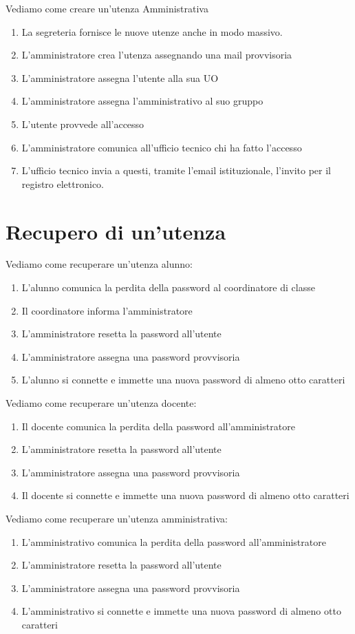 Vediamo come creare un'utenza Amministrativa
\begin{enumerate}
	\item La segreteria fornisce le nuove utenze anche in modo massivo.
	\item L'amministratore crea l'utenza assegnando una mail provvisoria
	\item L'amministratore assegna l'utente alla sua UO
	\item L'amministratore assegna l'amministrativo al suo gruppo
	\item L'utente provvede all'accesso
	\item L'amministratore  comunica all'ufficio tecnico chi ha fatto l'accesso
	\item L'ufficio tecnico invia  a questi, tramite l'email istituzionale, 
	l'invito  per il registro elettronico.
\end{enumerate}
\section{Recupero di un'utenza}
Vediamo come recuperare un'utenza alunno:
\begin{enumerate}
	\item L'alunno comunica la perdita della password al coordinatore di classe
	\item Il coordinatore informa l'amministratore
	\item L'amministratore resetta la password all'utente
	\item L'amministratore assegna una password provvisoria 
	\item L'alunno si connette e immette una nuova password di almeno otto 
	caratteri 
\end{enumerate}
Vediamo come recuperare un'utenza docente:
\begin{enumerate}
	\item Il docente comunica la perdita della password all'amministratore
	\item L'amministratore resetta la password all'utente
	\item L'amministratore assegna una password provvisoria 
	\item Il docente si connette e immette una nuova password di almeno otto 
	caratteri 
\end{enumerate}
Vediamo come recuperare un'utenza amministrativa:
\begin{enumerate}
	\item L'amministrativo comunica la perdita della password all'amministratore
	\item L'amministratore resetta la password all'utente
	\item L'amministratore assegna una password provvisoria 
	\item L'amministrativo si connette e immette una nuova password di almeno 
	otto caratteri 
\end{enumerate}

